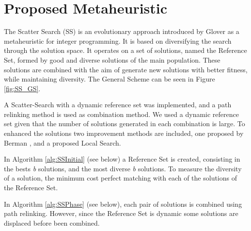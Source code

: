 \section{Proposed Metaheuristic}
The Scatter Search (SS)
is an evolutionary approach
introduced by Glover \cite{glover1977heuristics}
as a metaheuristic for integer programming.
It is based on diversifying the search
through the solution space.
It operates on a set of solutions,
named the Reference Set,
formed by good and diverse solutions of the main population.
These solutions are combined
with the aim of generate
new solutions with better fitness,
while maintaining diversity.
The General Scheme can be seen in Figure \ref{fig:SS_GS}.


A Scatter-Search
with a dynamic reference set
was implemented,
and a path relinking method
is used as combination method.
We used a dynamic reference set
given that the number of solutions generated
in each combination is large.
To enhanced the solutions
two improvement methods are included,
one proposed by Berman \cite{berman1987stochastic},
and a proposed Local Search.

In Algorithm \ref{alg:SSInitial} (see below)
a Reference Set is created,
consisting in the bests \textit{b} solutions,
and the most diverse \textit{b} solutions.
To measure the diversity of a solution,
the minimum cost perfect matching
with each of the solutions of the Reference Set.


In Algorithm \ref{alg:SSPhase} (see below),
each pair of solutions
is combined using path relinking.
However,
since the Reference Set is dynamic
some solutions are displaced
before been combined.

